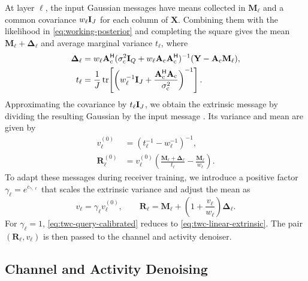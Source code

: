 At layer $\ell$, the input Gaussian messages have means collected in
$\mathbf M_\ell$ and a common covariance $w_\ell\mathbf{I}_J$ for each
column of $\mathbf X$. Combining them with the likelihood in
\eqref{eq:working-posterior} and completing the square gives the
mean $\mathbf M_\ell+\bm\Delta_\ell$ and average marginal variance
$t_\ell$, where
\begin{equation}
 \begin{aligned}
 \bm\Delta_\ell&=w_\ell\mathbf A_{\rm c}^{\mathsf H}
 (\sigma_{\rm c}^2\mathbf{I}_Q+w_\ell\mathbf A_{\rm c}\mathbf A_{\rm c}^{\mathsf H})^{-1}
 (\mathbf Y-\mathbf A_{\rm c}\mathbf M_\ell),
 \\
 t_\ell&=\frac1J\operatorname{tr}\!\left[
 \left(w_\ell^{-1}\mathbf{I}_J+
 \frac{\mathbf A_{\rm c}^{\mathsf H}\mathbf A_{\rm c}}{\sigma_{\rm c}^2}
 \right)^{-1}\right].
 \end{aligned}
 \label{eq:twc-linear-correction}
\end{equation}
Approximating the covariance by $t_\ell\mathbf{I}_J$, we obtain the
extrinsic message by dividing the resulting Gaussian by the input
message \cite{minka2001}. Its variance and mean are given by
\cite{cai2026}
\begin{equation}
 \begin{aligned}
 v_\ell^{(0)}&=(t_\ell^{-1}-w_\ell^{-1})^{-1},\\
 \mathbf R_\ell^{(0)}&=v_\ell^{(0)}
 \left(\frac{\mathbf M_\ell+\bm\Delta_\ell}{t_\ell}
       -\frac{\mathbf M_\ell}{w_\ell}\right).
 \end{aligned}
 \label{eq:twc-linear-extrinsic}
\end{equation}
To adapt these messages during receiver training, we introduce a
positive factor $\gamma_\ell=e^{c_{\gamma,\ell}}$ that scales the
extrinsic variance and adjust the mean as
\begin{equation}
 v_\ell=\gamma_\ell v_\ell^{(0)},\qquad
 \mathbf R_\ell=\mathbf M_\ell+
 \left(1+\frac{v_\ell}{w_\ell}\right)\bm\Delta_\ell.
 \label{eq:twc-query-calibrated}
\end{equation}
For $\gamma_\ell=1$, \eqref{eq:twc-query-calibrated} reduces to
\eqref{eq:twc-linear-extrinsic}. The pair
$(\mathbf R_\ell,v_\ell)$ is then passed to the channel and activity
denoiser.

\subsection{Channel and Activity Denoising}

